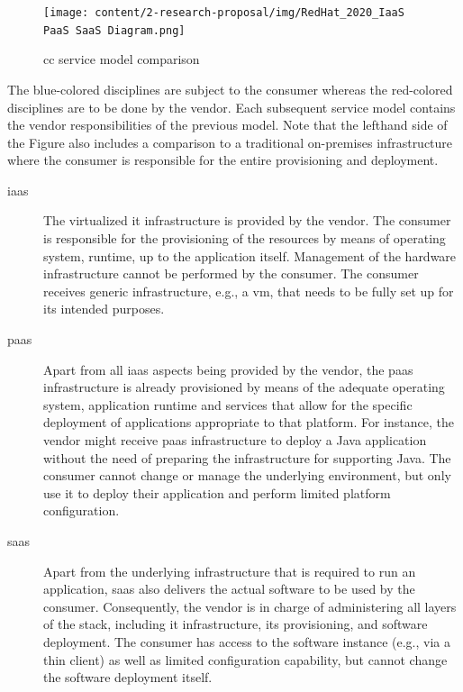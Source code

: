 		\begin{figure}[h!]
			\centering
			\texttt{[image: content/2-research-proposal/img/RedHat\_2020\_IaaS PaaS SaaS Diagram.png]}
			\caption{\acl{cc} service model comparison \cite{RedHatServiceimg}}
			\label{fig:foundations-cc-service-models}
		\end{figure}
	
		The blue-colored disciplines are subject to the consumer whereas the red-colored disciplines are to be done by the vendor. Each subsequent service model contains the vendor responsibilities of the previous model.  Note that the lefthand side of the Figure also includes a comparison to a traditional on-premises infrastructure where the consumer is responsible for the entire provisioning and deployment. 
		
		\begin{description}
			\item[\acf{iaas}] The virtualized \ac{it} infrastructure is provided by the vendor. The consumer is responsible for the provisioning of the resources by means of operating system, runtime, up to the application itself. Management of the hardware infrastructure cannot be performed by the consumer. \cite{NISTcc} The consumer receives generic infrastructure, e.g., a \ac{vm}, that needs to be fully set up for its intended purposes.
			\item[\acf{paas}] Apart from all \ac{iaas} aspects being provided by the vendor, the \ac{paas} infrastructure is already provisioned by means of the adequate operating system, application runtime and services that allow for the specific deployment of applications appropriate to that platform. \cite{NISTcc} For instance, the vendor might receive \ac{paas} infrastructure to deploy a Java application without the need of preparing the infrastructure for supporting Java. The consumer cannot change or manage the underlying environment, but only use it to deploy their application and perform limited platform configuration. \cite{NISTcc}
			\item[\acf{saas}] Apart from the underlying infrastructure that is required to run an application, \ac{saas} also delivers the actual software to be used by the consumer. \cite{NISTcc} Consequently, the vendor is in charge of administering all layers of the stack, including \ac{it} infrastructure, its provisioning, and software deployment. The consumer has access to the software instance (e.g., via a thin client) as well as limited configuration capability, but cannot change the software deployment itself. \cite{NISTcc}
		\end{description}
		
